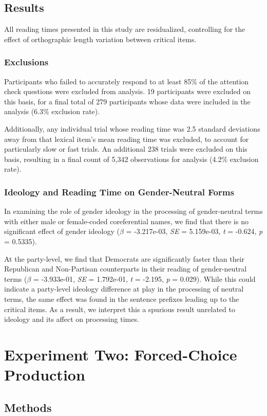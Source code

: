 \documentclass[10pt,letterpaper]{article}
\begin{document}
	\subsection{Results}
	All reading times presented in this study are residualized, controlling for the effect of orthographic length variation between critical items.
	\subsubsection{Exclusions}
	Participants who failed to accurately respond to at least 85\% of the attention check questions were excluded from analysis. 19 participants were excluded on this basis, for a final total of 279 participants whose data were included in the analysis (6.3\% exclusion rate). \par 
	Additionally, any individual trial whose reading time was 2.5 standard deviations away from that lexical item's mean reading time was excluded, to account for particularly slow or fast trials. An additional 238 trials were excluded on this basis, resulting in a final count of 5,342 observations for analysis (4.2\% exclusion rate). 
	\subsubsection{Ideology and Reading Time on Gender-Neutral Forms} In examining the role of gender ideology in the processing of gender-neutral terms with either male or female-coded coreferential names, we find that there is no significant effect of gender ideology ($\beta$ = -3.217e-03, \textit{SE} = 5.159e-03, \textit{t} = -0.624, \textit{p} = 0.5335). \par 
	At the party-level, we find that Democrats are significantly faster than their Republican and Non-Partisan counterparts in their reading of gender-neutral terms ($\beta$ = -3.933e-01, \textit{SE} = 1.792e-01, \textit{t} = -2.195, \textit{p} = 0.029). While this could indicate a party-level ideology difference at play in the processing of neutral terms, the same effect was found in the sentence prefixes leading up to the critical items. As a result, we interpret this a spurious result unrelated to ideology and its affect on processing times.
	
	
	\section{Experiment Two: Forced-Choice Production}
	\subsection{Methods}
\end{document}

